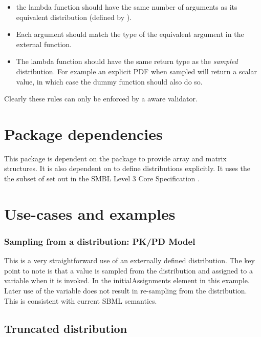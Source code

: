 \documentclass[draftspec]{sbmlpkgspec}
\begin{document}
\begin{itemize}
\item the lambda function should have the same number of arguments as
  its equivalent distribution (defined by \distribshort).
\item Each argument should match the type of the equivalent argument
  in the external function.
\item The lambda function should have the same return type as the
  \emph{sampled} distribution. For example an explicit PDF when
  sampled will return a scalar value, in which case the dummy function
  should also do so.
\end{itemize}

Clearly these rules can only be enforced by a \distribshort aware validator.

\section{Package dependencies}

This package is dependent on the \arrays package to provide array and
matrix structures. It is also dependent on \mathml \cite{mathml2} to
define distributions explicitly. It uses the the subset of \mathml set
out in the SMBL Level 3 Core Specification
\cite{l3v1c}.

\section{Use-cases and examples}

\subsubsection{Sampling from a distribution: PK/PD Model}

This is a very straightforward use of an externally defined
distribution. The key point to note is that a value is sampled from
the distribution and assigned to a variable when it is invoked. In the
initialAssignments element in this example. Later use of the variable
does not result in re-sampling from the distribution. This is
consistent with current SBML semantics.


\subsection{Truncated distribution}
\label{sec: truncated-eg}
\end{document}

